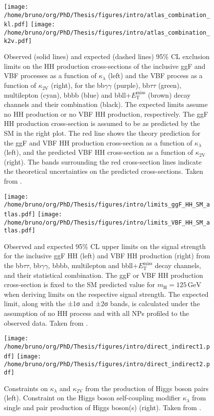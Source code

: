 \documentclass[11pt]{article}
\newcommand{\bbbb}{bbbb}
\newcommand{\bbgg}{bb$\gamma\gamma$}
\newcommand{\bbtt}{bb$\tau\tau$}
\newcommand{\bbll}{bbll+$E^{\text{miss}}_{\text{T}}$}
\newcommand{\kl}{\kappa_{\lambda}}
\newcommand{\kvv}{\kappa_{\text{2V}}}
\newcommand{\mh}{m_{\text{H}}}
\begin{document}
\begin{figure}
\texttt{[image: /home/bruno/org/PhD/Thesis/figures/intro/atlas\_combination\_kl.pdf]}
\texttt{[image: /home/bruno/org/PhD/Thesis/figures/intro/atlas\_combination\_k2v.pdf]}
\caption{\label{fig:scan_comb_atlas}Observed (solid lines) and expected (dashed lines) 95\% CL exclusion limits on the HH production cross-sections of the inclusive \ac{ggF} and \ac{VBF} processes as a function of \(\kl\) (left) and the \ac{VBF} process as a function of \(\kvv\) (right), for the \bbgg{} (purple), \bbtt{} (green), multilepton (cyan), \bbbb{} (blue) and \bbll{} (brown) decay channels and their combination (black). The expected limits assume no HH production or no \ac{VBF} HH production, respectively. The \ac{ggF} HH production cross-section is assumed to be as predicted by the SM in the right plot. The red line shows the theory prediction for the \ac{ggF} and \ac{VBF} HH production cross-section as a function of \(\kl\) (left), and the predicted \ac{VBF} HH cross-section as a function of \(\kvv\) (right). The bands surrounding the red cross-section lines indicate the theoretical uncertainties on the predicted cross-sections. Taken from \cite{atlas_hh_comb}.}
\end{figure}


\begin{figure}
\texttt{[image: /home/bruno/org/PhD/Thesis/figures/intro/limits\_ggF\_HH\_SM\_atlas.pdf]}
\texttt{[image: /home/bruno/org/PhD/Thesis/figures/intro/limits\_VBF\_HH\_SM\_atlas.pdf]}
\caption{\label{fig:limits_comb_atlas}Observed and expected 95\% CL upper limits on the signal strength for the inclusive \ac{ggF} HH (left) and \ac{VBF} HH production (right) from the \bbtt{}, \bbgg{}, \bbbb{}, multilepton and \bbll{} decay channels, and their statistical combination. The \ac{ggF} or \ac{VBF} HH production cross-section is fixed to the SM predicted value for \(\mh=125\,\si{\GeV}\) when deriving limits on the respective signal strength. The expected limit, along with the ±1σ and ±2σ bands, is calculated under the assumption of no HH process and with all NPs profiled to the observed data. Taken from \cite{atlas_hh_comb}.}
\end{figure}

\begin{figure}
\texttt{[image: /home/bruno/org/PhD/Thesis/figures/intro/direct\_indirect1.pdf]}
\texttt{[image: /home/bruno/org/PhD/Thesis/figures/intro/direct\_indirect2.pdf]}
\caption{\label{fig:direct_vs_indirect_cms}Constraints on \(\kl\) and \(\kvv\) from the production of Higgs boson pairs (left). Constraint on the Higgs boson self-coupling modifier \(\kl\) from single and pair production of Higgs boson(s) (right). Taken from \cite{higgs_10_years}.}
\end{figure}
\end{document}
